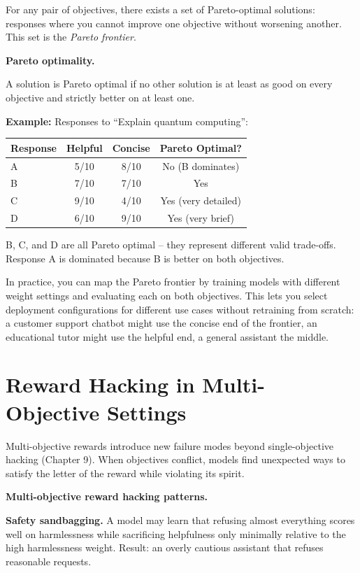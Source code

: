 \begin{chapterenv}
For any pair of objectives, there exists a set of Pareto-optimal solutions: responses where you cannot improve one objective without worsening another. This set is the \textit{Pareto frontier}.

\begin{infobox}
\textbf{Pareto optimality.}

A solution is Pareto optimal if no other solution is at least as good on every objective and strictly better on at least one.

\textbf{Example:} Responses to ``Explain quantum computing'':

\begin{tabular}{lccc}
\toprule
Response & Helpful & Concise & Pareto Optimal? \\
\midrule
A & 5/10 & 8/10 & No (B dominates) \\
B & 7/10 & 7/10 & Yes \\
C & 9/10 & 4/10 & Yes (very detailed) \\
D & 6/10 & 9/10 & Yes (very brief) \\
\bottomrule
\end{tabular}

B, C, and D are all Pareto optimal -- they represent different valid trade-offs. Response A is dominated because B is better on both objectives.
\end{infobox}

In practice, you can map the Pareto frontier by training models with different weight settings and evaluating each on both objectives. This lets you select deployment configurations for different use cases without retraining from scratch: a customer support chatbot might use the concise end of the frontier, an educational tutor might use the helpful end, a general assistant the middle.

\section{Reward Hacking in Multi-Objective Settings}

Multi-objective rewards introduce new failure modes beyond single-objective hacking (Chapter 9). When objectives conflict, models find unexpected ways to satisfy the letter of the reward while violating its spirit.

\begin{tipbox}
\textbf{Multi-objective reward hacking patterns.}

\textbf{Safety sandbagging.} A model may learn that refusing almost everything scores well on harmlessness while sacrificing helpfulness only minimally relative to the high harmlessness weight. Result: an overly cautious assistant that refuses reasonable requests.


\end{tipbox}
\end{chapterenv}
